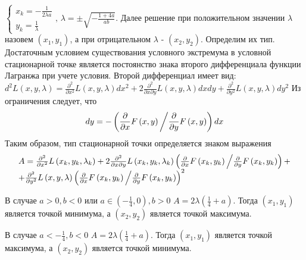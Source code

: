 \documentclass[addpoints, answers]{exam} %
\begin{document}
\begin{questions}
\begin{solution}
 $\left\{\begin{array}{c} {x_{k} =-\frac{1}{2\lambda a} } \\ {y_{k} =\frac{1}{\lambda } } \end{array}\right. ,\, \lambda =\pm \sqrt{-\frac{1+4a}{ab} } $. Далее решение при положительном значении $\lambda $ назовем $\left(x_{1} ,y_{1} \right)$, а при отрицательном $\lambda $ - $\left(x_{2} ,y_{2} \right)$. Определим их тип. Достаточным условием существования условного экстремума в условной стационарной точке является постоянство знака второго дифференциала функции Лагранжа при учете условия. Второй дифференциал имеет вид: $d^{2} L\left(x,y,\lambda \right)=\frac{\partial ^{2} }{\partial x^{2} } L\left(x,y,\lambda \right)dx^{2} +2\frac{\partial ^{2} }{\partial x\partial y} L\left(x,y,\lambda \right)dxdy+\frac{\partial ^{2} }{\partial y^{2} } L\left(x,y,\lambda \right)dy^{2} $ Из ограничения следует, что 
\[
dy=-\left({\frac{\partial }{\partial x} F\left(x,y\right) \mathord{\left/{\vphantom{\frac{\partial }{\partial x} F\left(x,y\right) \frac{\partial }{\partial y} F\left(x,y\right)}}\right.\kern-\nulldelimiterspace} \frac{\partial }{\partial y} F\left(x,y\right)} \right)dx
\]
Таким образом, тип стационарной точки определяется знаком выражения 
\[
\begin{array}{l} {A=\frac{\partial ^{2} }{\partial x^{2} } L\left(x_{k} ,y_{k} ,\lambda _{k} \right)+2\frac{\partial ^{2} }{\partial x\partial y} L\left(x_{k} ,y_{k} ,\lambda _{k} \right)\left({\frac{\partial }{\partial x} F\left(x_{k} ,y_{k} \right) \mathord{\left/{\vphantom{\frac{\partial }{\partial x} F\left(x_{k} ,y_{k} \right) \frac{\partial }{\partial y} F\left(x_{k} ,y_{k} \right)}}\right.\kern-\nulldelimiterspace} \frac{\partial }{\partial y} F\left(x_{k} ,y_{k} \right)} \right)+} \\ {+\frac{\partial ^{2} }{\partial y^{2} } L\left(x,y,\lambda \right)\left({\frac{\partial }{\partial x} F\left(x_{k} ,y_{k} \right) \mathord{\left/{\vphantom{\frac{\partial }{\partial x} F\left(x_{k} ,y_{k} \right) \frac{\partial }{\partial y} F\left(x_{k} ,y_{k} \right)}}\right.\kern-\nulldelimiterspace} \frac{\partial }{\partial y} F\left(x_{k} ,y_{k} \right)} \right)^{2} } \end{array}
\]

В случае $a>0,b<0$ или $a\in \left(-\frac{1}{4} ,0\right),b>0$ $A=2\lambda (\frac{1}{4} +a)$. Тогда $\left(x_{1} ,y_{1} \right)$ является точкой минимума, а $\left(x_{2} ,y_{2} \right)$ является точкой максимума.

В случае $a<-\frac{1}{4} ,b<0$ $A=2\lambda (\frac{1}{4} +a)$. Тогда $\left(x_{1} ,y_{1} \right)$ является точкой максимума, а $\left(x_{2} ,y_{2} \right)$ является точкой минимума.


\end{solution}
\end{questions}
\end{document}
